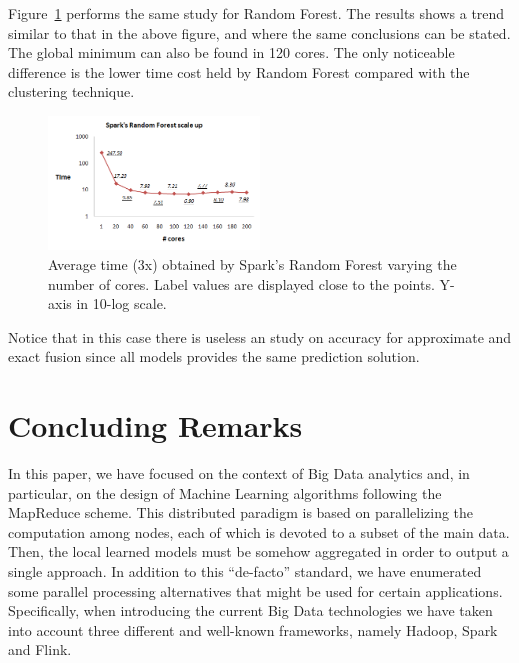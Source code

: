 \documentclass[3p,review]{elsarticle}
\begin{document}
Figure~\ref{fig:rf-spark} performs the same study for Random Forest. The results shows a trend similar to that in the above figure, and where the same conclusions can be stated. The global minimum can also be found in 120 cores. The only noticeable difference is the lower time cost held by Random Forest compared with the clustering technique.

\begin{figure}[!htp]
    \centering
    \includegraphics[width=0.5\textwidth]{rf-spark}
    \caption{Average time (3x) obtained by Spark's Random Forest varying the number of cores. Label values are displayed close to the points. Y-axis in 10-log scale.}
    \label{fig:rf-spark}
\end{figure}

Notice that in this case there is useless an study on accuracy for approximate and exact fusion since all models provides the same prediction solution.

\section{Concluding Remarks}\label{sec:conclusions}

In this paper, we have focused on the context of Big Data analytics and, in particular, on the design of Machine Learning algorithms following the MapReduce scheme. This distributed paradigm is based on parallelizing the computation among nodes, each of which is devoted to a subset of the main data. Then, the local learned models must be somehow aggregated in order to output a single approach. In addition to this ``de-facto'' standard, we have enumerated some parallel processing alternatives that might be used for certain applications. Specifically, when introducing the current Big Data technologies we have taken into account three different and well-known frameworks, namely Hadoop, Spark and Flink.
\end{document}
